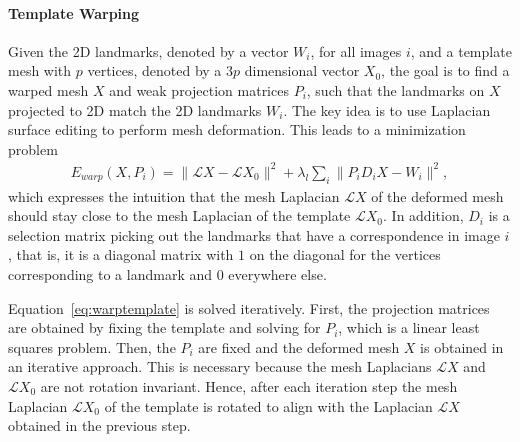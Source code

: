 \paragraph*{Template Warping} Given the 2D landmarks, denoted by a vector $W_i$, for all images $i$, and a template mesh with $p$ vertices, denoted by a $3p$ dimensional vector $X_0$, the goal is to find a warped mesh $X$ and weak projection matrices $P_i$, such that the landmarks on $X$ projected to 2D match the 2D landmarks $W_i$. The key idea is to use Laplacian surface editing \cite{Sorkine:2004:LSE} to perform mesh deformation. This leads to a minimization problem
%
\begin{align}
\label{eq:warptemplate}
E_{warp}(X,P_{i})=\|\mathcal{L}X - \mathcal{L}X_{0}\|^2+\lambda_{l}\sum_{i}{\|P_{i}D_{i}X-W_{i}\|^2},
\end{align} 
%
which expresses the intuition that the mesh Laplacian \cite{Meyer2003} $\mathcal{L}X$ of the deformed mesh should stay close to the mesh Laplacian of the template $\mathcal{L}X_{0}$. In addition, $D_{i}$ is a selection matrix picking out the landmarks that have a correspondence in image $i$, that is, it is a diagonal matrix with $1$ on the diagonal for the vertices corresponding to a landmark and $0$ everywhere else. 

Equation~\ref{eq:warptemplate} is solved iteratively. First, the projection matrices are obtained by fixing the template and solving for $P_i$, which is a linear least squares problem. Then, the $P_i$ are fixed and the deformed mesh $X$ is obtained in an iterative approach. This is necessary because the mesh Laplacians $\mathcal{L}X$ and $\mathcal{L}X_0$ are not rotation invariant. Hence, after each iteration step the mesh Laplacian $\mathcal{L}X_0$ of the template is rotated to align with the Laplacian $\mathcal{L}X$ obtained in the previous step.

%

